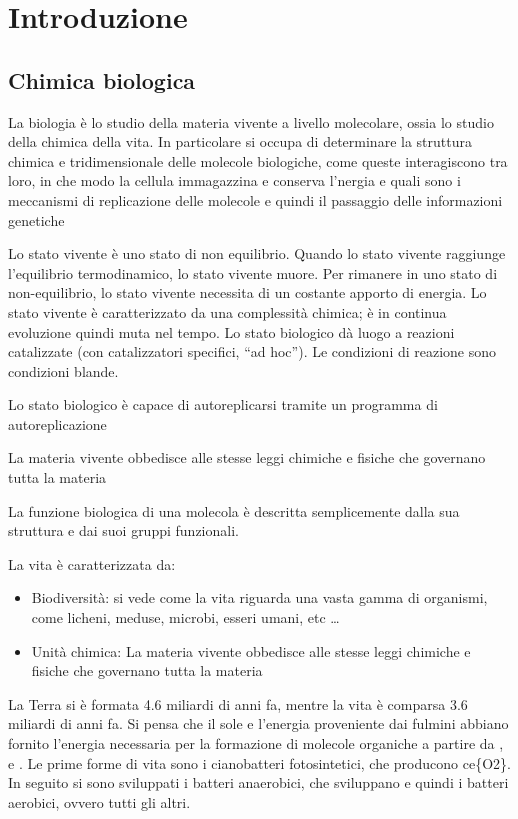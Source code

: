 \part{Introduzione}


\chapter{Chimica biologica}

La biologia è lo studio della materia vivente a livello molecolare,
ossia lo studio della chimica della vita. In particolare si occupa di
determinare la struttura chimica e tridimensionale delle molecole
biologiche, come queste interagiscono tra loro, in che modo la cellula
immagazzina e conserva l'nergia e quali sono i meccanismi di
replicazione delle molecole e quindi il passaggio delle informazioni
genetiche

Lo stato vivente è uno stato di non equilibrio. Quando lo stato vivente
raggiunge l'equilibrio termodinamico, lo stato vivente muore. Per
rimanere in uno stato di non-equilibrio, lo stato vivente necessita di
un costante apporto di energia. Lo stato vivente è caratterizzato da una
complessità chimica; è in continua evoluzione quindi muta nel tempo. Lo
stato biologico dà luogo a reazioni catalizzate (con catalizzatori
specifici, ``ad hoc''). Le condizioni di reazione sono condizioni
blande.

Lo stato biologico è capace di autoreplicarsi tramite un programma di
autoreplicazione

La materia vivente obbedisce alle stesse leggi chimiche e fisiche che
governano tutta la materia

La funzione biologica di una molecola è descritta semplicemente dalla
sua struttura e dai suoi gruppi funzionali.

La vita è caratterizzata da:
\begin{itemize}
\item Biodiversità: si vede come la vita
riguarda una vasta gamma di organismi, come licheni, meduse, microbi,
esseri umani, etc \ldots{}
\item Unità chimica: La materia vivente obbedisce
alle stesse leggi chimiche e fisiche che governano tutta la materia
\end{itemize}

La Terra si è formata 4.6 miliardi di anni fa, mentre la vita è comparsa
3.6 miliardi di anni fa. Si pensa che il sole e l'energia proveniente
dai fulmini abbiano fornito l'energia necessaria per la formazione di
molecole organiche a partire da , e . Le prime
forme di vita sono i cianobatteri fotosintetici, che producono ce\{O2\}.
In seguito si sono sviluppati i batteri anaerobici, che sviluppano
 e quindi i batteri aerobici, ovvero tutti gli altri.


